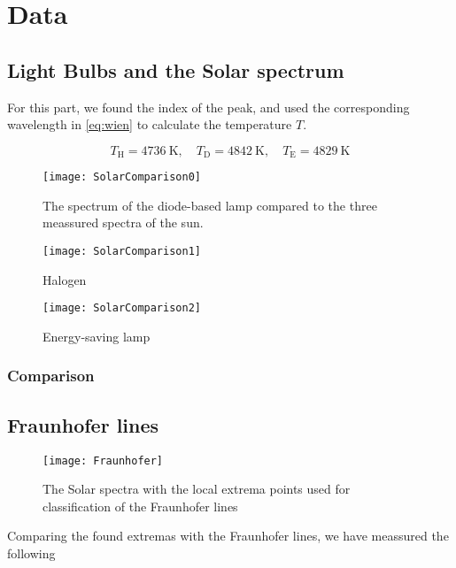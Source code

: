 \section{Data}

\subsection{Light Bulbs and the Solar spectrum}
For this part, we found the index of the peak, and used the corresponding
wavelength in \cref{eq:wien} to calculate the temperature $T$.

\begin{equation}
    T_{\text{H}} = \SI{4736}{\kelvin}, \quad T_{\text{D}} =
    \SI{4842}{\kelvin}, \quad T_{\text{E}} = \SI{4829}{\kelvin}
\end{equation}

\begin{figure}[h!]
\centering
\texttt{[image: SolarComparison0]}
\caption{The spectrum of the diode-based lamp compared to the three meassured spectra of
the sun.} 
\label{diode}
\end{figure}

\begin{figure}[h!]
\centering
\texttt{[image: SolarComparison1]}
\caption{Halogen}
\label{halogen}
\end{figure}

\begin{figure}[h!]
\centering
\texttt{[image: SolarComparison2]}
\caption{Energy-saving lamp}
\label{Energy-saving}
\end{figure}

\subsubsection{Comparison}

\subsection{Fraunhofer lines}
\begin{figure}[h]
\centering
\texttt{[image: Fraunhofer]}
\caption{The Solar spectra with the local extrema points used for
classification of the Fraunhofer lines}
\label{frauenhofer}
\end{figure}

Comparing the found extremas with the Fraunhofer lines, we have meassured the
following

